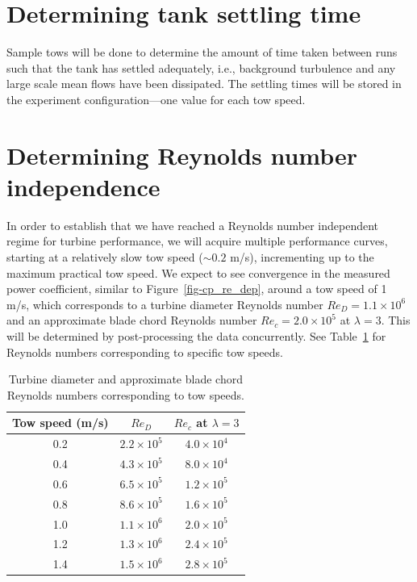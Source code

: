 \documentclass[12pt,letterpaper]{scrreprt}
\begin{document}
\section{Determining tank settling time}

Sample tows will be done to determine the amount of time taken between runs such
that the tank has settled adequately, i.e., background turbulence and any large
scale mean flows have been dissipated. The settling times will be stored in the
experiment configuration---one value for each tow speed.


\section{Determining Reynolds number independence}

In order to establish that we have reached a Reynolds number independent regime
for turbine performance, we will acquire multiple performance curves, starting
at a relatively slow tow speed ($\sim 0.2$ m/s), incrementing up to the maximum
practical tow speed. We expect to see convergence in the measured power
coefficient, similar to Figure~\ref{fig-cp_re_dep}, around a tow speed of 1 m/s,
which corresponds to a turbine diameter Reynolds number $Re_D = 1.1 \times 10^6$
and an approximate blade chord Reynolds number $Re_c = 2.0 \times 10^5$ at
$\lambda = 3$. This will be determined by post-processing the data concurrently.
See Table~\ref{tab-re} for Reynolds numbers corresponding to specific tow
speeds.

\begin{table}[ht]
\centering
\begin{tabular}{c|c|c}
Tow speed (m/s) & $Re_D$ & $Re_c$ at $\lambda = 3$ \\ 
\hline 
0.2 & $2.2 \times 10^5$ & $4.0 \times 10^4$ \\ 
0.4 & $4.3 \times 10^5$ & $8.0 \times 10^4$ \\ 
0.6 & $6.5 \times 10^5$ & $1.2 \times 10^5$ \\ 
0.8 & $8.6 \times 10^5$ & $1.6 \times 10^5$ \\ 
1.0 & $1.1 \times 10^6$ & $2.0 \times 10^5$ \\ 
1.2 & $1.3 \times 10^6$ & $2.4 \times 10^5$ \\ 
1.4 & $1.5 \times 10^6$ & $2.8 \times 10^5$ \\
\end{tabular} 
\caption{Turbine diameter and approximate blade chord Reynolds numbers
corresponding to tow speeds.} \label{tab-re}
\end{table}
\end{document}

